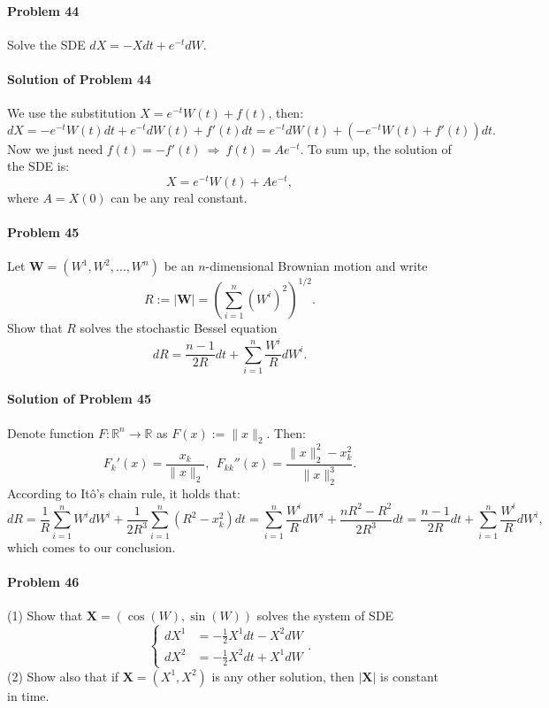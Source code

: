 \documentclass{article}
\begin{document}
\paragraph{Problem 44} Solve the SDE $dX=-Xdt+e^{-t}dW$.

\paragraph{Solution of Problem 44} We use the substitution $X=e^{-t}W(t)+f(t)$, then:
\[dX = -e^{-t}W(t)dt+e^{-t}dW(t) + f'(t)dt = e^{-t}dW(t) + (-e^{-t}W(t)+f'(t))dt.\]
Now we just need $f(t)=-f'(t)~\Rightarrow~ f(t)=Ae^{-t}$. To sum up, the solution of the SDE is:
\[X = e^{-t}W(t)+Ae^{-t},\]
where $A=X(0)$ can be any real constant. 



\paragraph{Problem 45} Let $\mathbf{W}=(W^1,W^2,\ldots, W^n)$ be an $n$-dimensional Brownian motion and write 
\[R := |\mathbf{W}|=\left(\sum_{i=1}^{n}(W^i)^2\right)^{1/2}.\]
Show that $R$ solves the stochastic Bessel equation
\[dR=\frac{n-1}{2R}dt+\sum_{i=1}^{n}\frac{W^i}{R}dW^i.\]

\paragraph{Solution of Problem 45} Denote function  $F:\mathbb{R}^n\rightarrow\mathbb{R}$ as $F(x):= \|x\|_2$. Then:
\[F_k'(x)=\frac{x_k}{\|x\|_2},~~F_{kk}''(x)=\frac{\|x\|_2^2-x_k^2}{\|x\|_2^3}.\]
According to Itô's chain rule, it holds that:
\[dR = \frac{1}{R}\sum_{i=1}^{n} W^i dW^i + \frac{1}{2R^3}\sum_{i=1}^{n}(R^2-x_k^2) dt = \sum_{i=1}^{n}\frac{W^i}{R}dW^i + \frac{nR^2-R^2}{2R^3}dt = \frac{n-1}{2R}dt+\sum_{i=1}^{n}\frac{W^i}{R}dW^i,\]
which comes to our conclusion.

\paragraph{Problem 46} (1) Show that $\mathbf{X}=(\cos(W),\sin(W))$ solves the system of SDE
\[\begin{cases}dX^1&=-\frac12 X^1dt-X^2dW\\ dX^2&=-\frac12 X^2 dt+X^1 dW\end{cases}.\]
(2) Show also that if $\mathbf{X}=(X^1,X^2)$ is any other solution, then $|\mathbf{X}|$ is constant in time.
\end{document}
